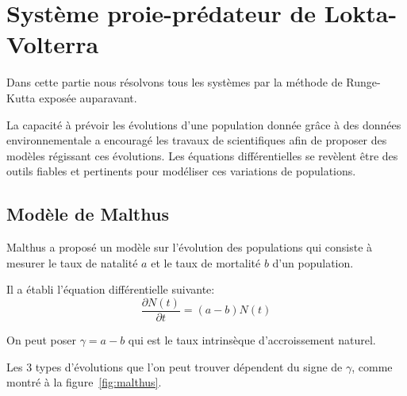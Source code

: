 \section{Système proie-prédateur de Lokta-Volterra}
Dans cette partie nous résolvons tous les systèmes par la méthode de Runge-Kutta exposée auparavant.

La capacité à prévoir les évolutions d'une population donnée grâce à des données environnementale a encouragé les travaux de scientifiques afin de proposer des modèles régissant ces évolutions. Les équations différentielles se revèlent être des outils fiables et pertinents pour modéliser ces variations de populations.

\subsection{Modèle de Malthus}
Malthus a proposé un modèle sur l'évolution des populations qui consiste à mesurer le taux de natalité $a$ et le taux de mortalité $b$ d'un population.

Il a établi l'équation différentielle suivante: 
\begin{equation}
\frac{\partial N(t)}{\partial t} = (a-b)N(t)
\end{equation}

On peut poser $\gamma = a-b$ qui est le taux intrinsèque d'accroissement naturel.

Les 3 types d'évolutions que l'on peut trouver dépendent du signe de $\gamma$, comme montré à la figure~\vref{fig:malthus}.

